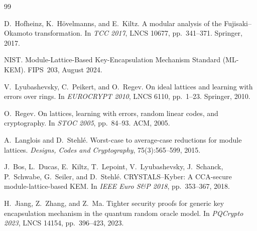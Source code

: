 \documentclass[11pt,a4paper]{article}
\theoremstyle{definition}
\begin{document}
\begin{thebibliography}{99}

D.~Hofheinz, K.~H\"ovelmanns, and E.~Kiltz.
\newblock A modular analysis of the Fujisaki--Okamoto transformation.
\newblock In \emph{TCC 2017}, LNCS 10677, pp.~341--371. Springer, 2017.

NIST.
\newblock Module-Lattice-Based Key-Encapsulation Mechanism Standard (ML-KEM). FIPS~203, August 2024.

V.~Lyubashevsky, C.~Peikert, and O.~Regev.
\newblock On ideal lattices and learning with errors over rings.
\newblock In \emph{EUROCRYPT 2010}, LNCS 6110, pp.~1--23. Springer, 2010.

O.~Regev.
\newblock On lattices, learning with errors, random linear codes, and cryptography.
\newblock In \emph{STOC 2005}, pp.~84--93. ACM, 2005.

A.~Langlois and D.~Stehl\'e.
\newblock Worst-case to average-case reductions for module lattices.
\newblock \emph{Designs, Codes and Cryptography}, 75(3):565--599, 2015.

J.~Bos, L.~Ducas, E.~Kiltz, T.~Lepoint, V.~Lyubashevsky, J.~Schanck, P.~Schwabe, G.~Seiler, and D.~Stehl\'e.
\newblock CRYSTALS--Kyber: A CCA-secure module-lattice-based KEM.
\newblock In \emph{IEEE Euro S\&P 2018}, pp.~353--367, 2018.

H.~Jiang, Z.~Zhang, and Z.~Ma.
\newblock Tighter security proofs for generic key encapsulation mechanism in the quantum random oracle model.
\newblock In \emph{PQCrypto 2023}, LNCS 14154, pp.~396--423, 2023.

\end{thebibliography}
\end{document}
